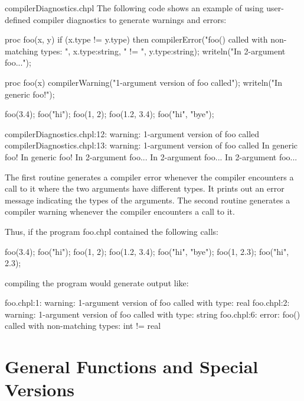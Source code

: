 \begin{chapelexample}{compilerDiagnostics.chpl}
The following code shows an example of using user-defined compiler
diagnostics to generate warnings and errors:
\begin{chapel}
proc foo(x, y) {
  if (x.type != y.type) then
    compilerError("foo() called with non-matching types: ", 
                  x.type:string, " != ", y.type:string);
  writeln("In 2-argument foo...");
}

proc foo(x) {
  compilerWarning("1-argument version of foo called");
  writeln("In generic foo!");
}
\end{chapel}
\begin{chapelpost}
foo(3.4);
foo("hi");
foo(1, 2);
foo(1.2, 3.4);
foo("hi", "bye");
\end{chapelpost}
\begin{chapeloutput}
compilerDiagnostics.chpl:12: warning: 1-argument version of foo called
compilerDiagnostics.chpl:13: warning: 1-argument version of foo called
In generic foo!
In generic foo!
In 2-argument foo...
In 2-argument foo...
In 2-argument foo...
\end{chapeloutput}

The first routine generates a compiler error whenever the compiler
encounters a call to it where the two arguments have different types.
It prints out an error message indicating the types of the arguments.
The second routine generates a compiler warning whenever the compiler
encounters a call to it.

Thus, if the program foo.chpl contained the following calls:

\begin{numberedchapel}
foo(3.4);
foo("hi");
foo(1, 2);
foo(1.2, 3.4);
foo("hi", "bye");
foo(1, 2.3);
foo("hi", 2.3);
\end{numberedchapel}

\noindent compiling the program would generate output like:

\begin{commandline}
foo.chpl:1: warning: 1-argument version of foo called with type: real
foo.chpl:2: warning: 1-argument version of foo called with type: string
foo.chpl:6: error: foo() called with non-matching types: int != real
\end{commandline}

\end{chapelexample}

\section{General Functions and Special Versions}
\label{General_Functions_and_Special_Versions}

